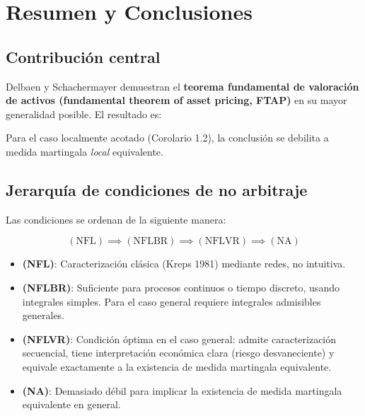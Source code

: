 \documentclass[12pt]{article}
\begin{document}
\section{Resumen y Conclusiones}

\subsection{Contribuci\'on central}

Delbaen y Schachermayer demuestran el \textbf{teorema fundamental de valoraci\'on de activos (fundamental theorem of asset pricing, FTAP)} en su mayor generalidad posible. El resultado es:

\begin{center}
\end{center}

Para el caso localmente acotado (Corolario 1.2), la conclusi\'on se debilita a medida martingala \emph{local} equivalente.

\subsection{Jerarqu\'ia de condiciones de no arbitraje}

Las condiciones se ordenan de la siguiente manera:

\begin{equation}
    (\text{NFL}) \implies (\text{NFLBR}) \implies (\text{NFLVR}) \implies (\text{NA})
\end{equation}

\begin{itemize}
    \item \textbf{(NFL)}: Caracterizaci\'on cl\'asica (Kreps 1981) mediante redes, no intuitiva.
    \item \textbf{(NFLBR)}: Suficiente para procesos continuos o tiempo discreto, usando integrales simples. Para el caso general requiere integrales admisibles generales.
    \item \textbf{(NFLVR)}: Condici\'on \'optima en el caso general: admite caracterizaci\'on secuencial, tiene interpretaci\'on econ\'omica clara (riesgo desvaneciente) y equivale exactamente a la existencia de medida martingala equivalente.
    \item \textbf{(NA)}: Demasiado d\'ebil para implicar la existencia de medida martingala equivalente en general.
\end{itemize}
\end{document}
